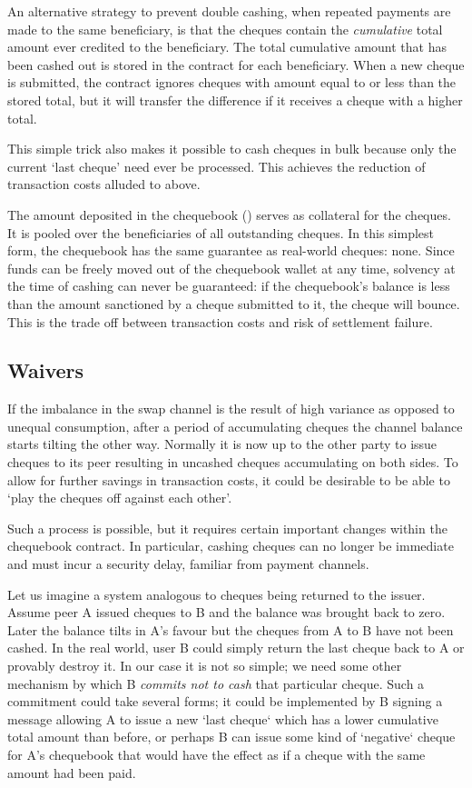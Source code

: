 An alternative strategy to prevent double cashing, when repeated payments are made to the same beneficiary, is that the cheques contain the \emph{cumulative} total amount ever credited to the beneficiary. The total cumulative amount that has been cashed out is stored in the contract for each beneficiary. When a new cheque is submitted, the contract ignores cheques with amount equal to or less than the stored total, but it will transfer the difference if it receives a cheque with a higher total.


This simple trick also makes it possible to cash cheques in bulk because only the current `last cheque' need ever be processed. This achieves the reduction of transaction costs alluded to above.

The amount deposited in the chequebook () serves as collateral for the cheques. It is pooled over the beneficiaries of all outstanding cheques. In this simplest form, the chequebook has the same guarantee as real-world cheques: none. Since funds can be freely moved out of the chequebook wallet at any time, solvency at the time of cashing can never be guaranteed: if the chequebook's balance is less than the amount sanctioned by a cheque submitted to it, the cheque will bounce. This is the trade off between transaction costs and risk of settlement failure.

\subsection{Waivers}\label{sec:waiver}

If the imbalance in the swap channel is the result of high variance as opposed to unequal consumption, after a period of accumulating cheques the channel balance starts tilting the other way. Normally it is now up to the other party to issue cheques to its peer resulting in uncashed cheques accumulating on both sides.
To allow for further savings in transaction costs, it could be desirable to be able to `play the cheques off against each other'.

Such a process is possible, but it requires certain important changes within the chequebook contract. In particular, cashing cheques can no longer be immediate and must incur a security delay, familiar from payment channels.

Let us imagine a system analogous to cheques being returned to the issuer. Assume peer A issued cheques to B and the balance was brought back to zero. Later the balance tilts in A's favour but the cheques from A to B have not been cashed. In the real world, user B could simply return the last cheque back to A or provably destroy it. In our case it is not so simple; we need some other mechanism by which B  \emph{commits not to cash} that particular cheque. Such a commitment could take several forms; it could be implemented by B signing a message allowing A to issue a new `last cheque` which has a lower cumulative total amount than before, or perhaps B can issue some kind of `negative` cheque for A's chequebook that would have the effect as if a cheque with the same amount had been paid. 

